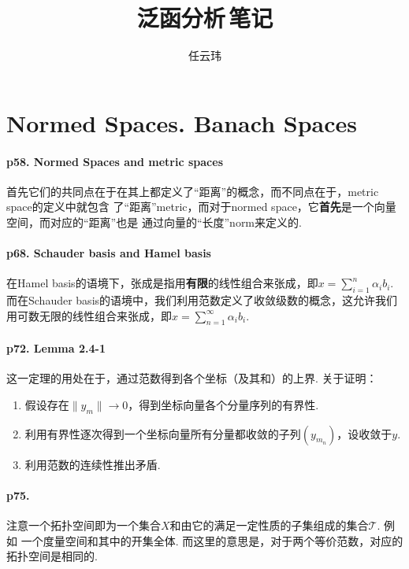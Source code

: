 

\title{泛函分析$\,$笔记}
\author{任云玮}
\date{}



\maketitle
\tableofcontents
\newpage

\setcounter{section}{1}
\section{Normed Spaces. Banach Spaces}
  \paragraph{p58. Normed Spaces and metric spaces}
    首先它们的共同点在于在其上都定义了“距离”的概念，而不同点在于，metric space的定义中就包含
    了“距离”metric，而对于normed space，它\textbf{首先}是一个向量空间，而对应的“距离”也是
    通过向量的“长度”norm来定义的. 

  \paragraph{p68. Schauder basis and Hamel basis}
    在Hamel basis的语境下，张成是指用\textbf{有限}的线性组合来张成，即$x=\sum_{i=1}^n
    \alpha_ib_i$. 而在Schauder basis的语境中，我们利用范数定义了收敛级数的概念，这允许我们
    用$\textbf{可数无限}$的线性组合来张成，即$x=\sum_{n=1}^\infty\alpha_ib_i$.

  \paragraph{p72. Lemma 2.4-1}
    这一定理的用处在于，通过范数得到各个坐标（及其和）的上界. 
    关于证明：
    \begin{enumerate}
      \item 假设存在$\|y_m\|\to 0$，得到坐标向量各个分量序列的有界性. 
      \item 利用有界性逐次得到一个坐标向量所有分量都收敛的子列$(y_{m_n})$，设收敛于$y$.
      \item 利用范数的连续性推出矛盾. 
    \end{enumerate}

  \paragraph{p75.}
    注意一个拓扑空间即为一个集合$X$和由它的满足一定性质的子集组成的集合$\mathcal{T}$. 例如
    一个度量空间和其中的开集全体. 而这里的意思是，对于两个等价范数，对应的拓扑空间是相同的. 
 
